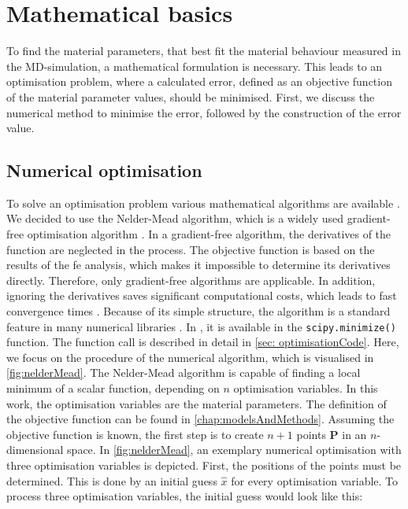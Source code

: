 \section{Mathematical basics} \label{sec: mathematics}

To find the material parameters, that best fit the material behaviour measured in the MD-simulation, a mathematical formulation is necessary. This leads to an optimisation problem, where a calculated error, defined as an objective function of the material parameter values, should be minimised. First, we discuss the numerical method to minimise the error, followed by the construction of the error value.

\subsection{Numerical optimisation} \label{subsec: numericaloptimisation}
To solve an optimisation problem various mathematical algorithms are available \cite{rios_derivative-free_2013}. We decided to use the Nelder-Mead algorithm, which is a widely used gradient-free optimisation algorithm \cite{gao_implementing_2012}. In a gradient-free algorithm, the derivatives of the function are neglected in the process. The objective function is based on the results of the \acrshort{fe} analysis, which makes it impossible to determine its derivatives directly. Therefore, only gradient-free algorithms are applicable. In addition, ignoring the derivatives saves significant computational costs, which leads to fast convergence times \cite{pham_comparative_2011}. Because of its simple structure, the algorithm is a standard feature in many numerical libraries \cite{singer_efficient_2004}. In , it is available in the \verb|scipy.minimize()| function. The function call is described in detail in \autoref{sec: optimisationCode}. Here, we focus on the procedure of the numerical algorithm, which is visualised in \autoref{fig:nelderMead}. The Nelder-Mead algorithm is capable of finding a local minimum of a scalar function, depending on $n$ optimisation variables. In this work, the optimisation variables are the material parameters. The definition of the objective function can be found in \autoref{chap:modelsAndMethods}. Assuming the objective function is known, the first step is to create $n+1$ points $\mathbf{P}$ in an $n$-dimensional space. In \autoref{fig:nelderMead}, an exemplary numerical optimisation with three optimisation variables is depicted. First, the positions of the points must be determined. This is done by an initial guess $\hat{x}$ for every optimisation variable. To process three optimisation variables, the initial guess would look like this: 

